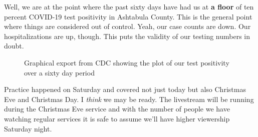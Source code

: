 Well, we are at the point where the past sixty days have had us at
\textbf{a floor} of ten percent COVID-19 test positivity in Ashtabula
County. This is the general point where things are considered out of
control. Yeah, our case counts are down. Our hospitalizations are up,
though. This puts the validity of our testing numbers in doubt.

\begin{figure}
\centering
{}
\caption{Graphical export from CDC showing the plot of our test
positivity over a sixty day period}
\end{figure}

Practice happened on Saturday and covered not just today but also
Christmas Eve and Christmas Day. I \emph{think} we may be ready. The
livestream will be running during the Christmas Eve service and with the
number of people we have watching regular services it is safe to assume
we'll have higher viewership Saturday night.
